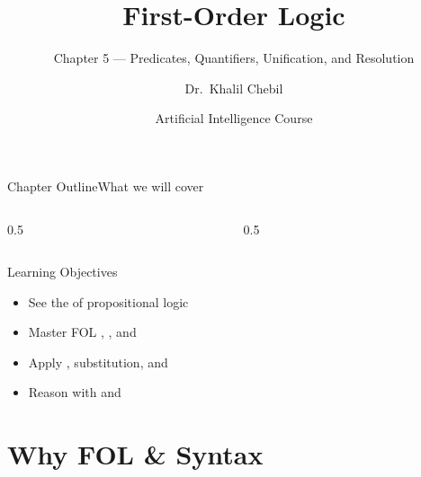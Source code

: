 \documentclass[aspectratio=169,11pt]{beamer}
\title[Ch.\,5 — First-Order Logic]{First-Order Logic}
\subtitle{Chapter 5 — Predicates, Quantifiers, Unification, and Resolution}
\author{Dr.\ Khalil Chebil}
\date{Artificial Intelligence Course}
\begin{document}
{
\begin{frame}
  \titlepage
\end{frame}}

\begin{frame}{Chapter Outline}{What we will cover}
  \begin{columns}[T]
    \begin{column}{0.5\textwidth}
      \tableofcontents[sections={1-3}]
    \end{column}
    \begin{column}{0.5\textwidth}
      \tableofcontents[sections={4-5}]
    \end{column}
  \end{columns}
  \vfill
  \begin{block}{Learning Objectives}
    \begin{itemize}
      \item See the  of propositional logic
      \item Master FOL , , and 
      \item Apply , substitution, and 
      \item Reason with  and 
    \end{itemize}
  \end{block}
\end{frame}

\section{Why FOL \& Syntax}
\end{document}
